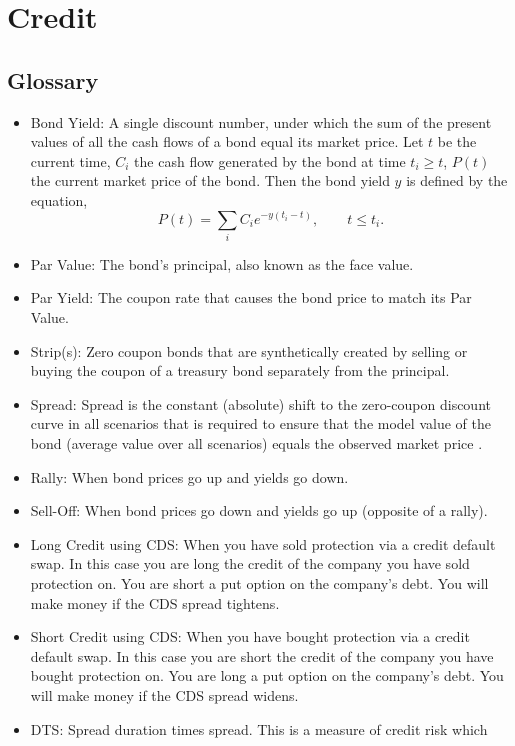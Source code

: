 \documentclass{amsart}
\theoremstyle{plain}
\numberwithin{equation}{section}
\begin{document}
\section{Credit}
\subsection{Glossary}
\begin{itemize}
\item Bond Yield: A single discount number, under which
the sum of the present values of all the cash flows of a bond equal 
its market price. Let $t$ be the current time, $C_i$ the cash flow generated by the bond at
time $t_i \geq t$, $P(t)$ the current market price of the bond. Then the bond yield
$y$ is defined by the equation,
\begin{equation}
P(t) = \sum_{i} C_i e^{- y (t_i - t )}, \qquad t \leq t_i.
\label{eq:bond_yield}
\end{equation}
\item Par Value: The bond's principal, also known as the face value. 
\item Par Yield: The coupon rate that causes the bond price to match 
its Par Value.
\item Strip(s): Zero coupon bonds that are synthetically created by 
selling or buying the coupon of a treasury bond separately from the principal.
\item Spread: Spread is the constant (absolute) shift to the zero-coupon discount curve in all scenarios that is required to ensure that the model value of the bond (average value over all scenarios) equals the observed market price \cite{dor2007dtssm}.
\item Rally: When bond prices go up and yields go down.
\item Sell-Off: When bond prices go down and yields go up (opposite of a rally).
\item Long Credit using CDS: When you have sold protection via a credit default swap. In this case you are long the credit of the company you have sold protection on. You are short a put option on the company's debt. You will make money
if the CDS spread tightens.
\item Short Credit using CDS: When you have bought protection via a credit default swap. In this case you are short the credit of the company you have bought protection on. You are long a put option on the company's debt. You will make money
if the CDS spread widens.
\item DTS: Spread duration times spread. This is a measure of credit risk which 

\end{itemize}
\end{document}
